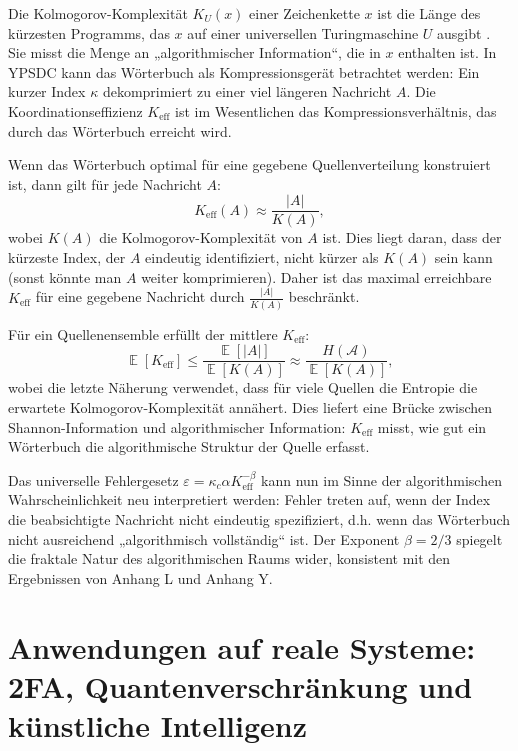 \documentclass[12pt,a4paper]{article}
\theoremstyle{remark}
\newcommand{\Keff}{K_{\mathrm{eff}}}
\DeclareMathOperator{\E}{\mathbb{E}}
\begin{document}
	Die Kolmogorov-Komplexität $K_U(x)$ einer Zeichenkette $x$ ist die Länge des kürzesten Programms, das $x$ auf einer universellen Turingmaschine $U$ ausgibt \cite{Kolmogorov1965}. Sie misst die Menge an „algorithmischer Information“, die in $x$ enthalten ist. In YPSDC kann das Wörterbuch als Kompressionsgerät betrachtet werden: Ein kurzer Index $\kappa$ dekomprimiert zu einer viel längeren Nachricht $A$. Die Koordinationseffizienz $\Keff$ ist im Wesentlichen das Kompressionsverhältnis, das durch das Wörterbuch erreicht wird.
	
	Wenn das Wörterbuch optimal für eine gegebene Quellenverteilung konstruiert ist, dann gilt für jede Nachricht $A$:
	\begin{equation}
		\Keff(A) \approx \frac{|A|}{K(A)}, \label{eq:kolmogorov}
	\end{equation}
	wobei $K(A)$ die Kolmogorov-Komplexität von $A$ ist. Dies liegt daran, dass der kürzeste Index, der $A$ eindeutig identifiziert, nicht kürzer als $K(A)$ sein kann (sonst könnte man $A$ weiter komprimieren). Daher ist das maximal erreichbare $\Keff$ für eine gegebene Nachricht durch $\frac{|A|}{K(A)}$ beschränkt.
	
	Für ein Quellenensemble erfüllt der mittlere $\Keff$:
	\begin{equation}
		\E[\Keff] \le \frac{\E[|A|]}{\E[K(A)]} \approx \frac{H(\mathcal{A})}{\E[K(A)]},
	\end{equation}
	wobei die letzte Näherung verwendet, dass für viele Quellen die Entropie die erwartete Kolmogorov-Komplexität annähert. Dies liefert eine Brücke zwischen Shannon-Information und algorithmischer Information: $\Keff$ misst, wie gut ein Wörterbuch die algorithmische Struktur der Quelle erfasst.
	
	Das universelle Fehlergesetz $\varepsilon = \kappa_c \alpha K_{\mathrm{eff}}^{-\beta}$ kann nun im Sinne der algorithmischen Wahrscheinlichkeit neu interpretiert werden: Fehler treten auf, wenn der Index die beabsichtigte Nachricht nicht eindeutig spezifiziert, d.h. wenn das Wörterbuch nicht ausreichend „algorithmisch vollständig“ ist. Der Exponent $\beta = 2/3$ spiegelt die fraktale Natur des algorithmischen Raums wider, konsistent mit den Ergebnissen von Anhang L und Anhang Y.
	
	\section{Anwendungen auf reale Systeme: 2FA, Quantenverschränkung und künstliche Intelligenz}
	\label{sec:applications}
	
\end{document}
